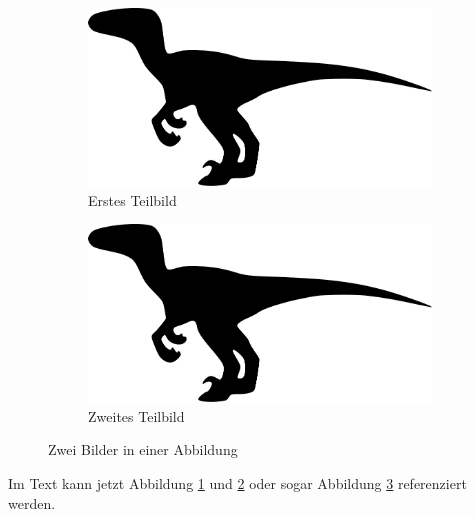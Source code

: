 \documentclass{scrartcl}
\begin{document}
\begin{figure}
	\centering
  	\begin{subfigure}{.45\textwidth}
		\centering
		\includegraphics[width=.5\textwidth]{raptor}
		\caption{Erstes Teilbild}\label{fig:raptor1}
	\end{subfigure}
	\begin{subfigure}{.45\textwidth}
		\centering
	    \includegraphics[width=.5\textwidth]{raptor}
	    \caption{Zweites Teilbild}\label{fig:raptor2}
    \end{subfigure}
    \caption{Zwei Bilder in einer Abbildung}\label{fig:raptors}
\end{figure}

Im Text kann jetzt Abbildung \ref{fig:raptor1} und \ref{fig:raptor2} oder sogar Abbildung \ref{fig:raptors} referenziert werden.
\end{document}
